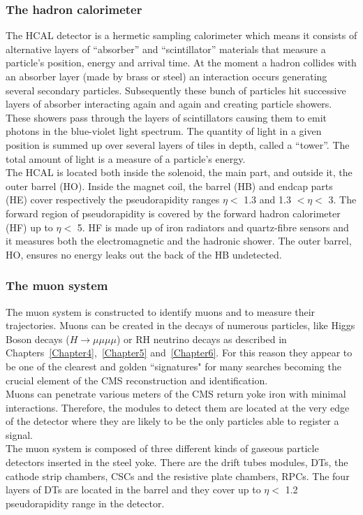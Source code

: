 \subsubsection{The hadron calorimeter}
The HCAL detector is a hermetic sampling calorimeter which means it
consists of alternative layers of ``absorber'' and ``scintillator''
materials that measure a particle’s position, energy and arrival time.
At the moment a hadron collides with an absorber layer (made by brass or steel) an interaction occurs generating several secondary
particles. Subsequently these bunch of particles hit successive layers
of absorber interacting again and again and creating particle showers.
These showers pass through the layers of scintillators
causing them to emit photons in the blue-violet light spectrum.
The quantity of light in a given position is summed up over several
layers of tiles in depth, called a “tower”. The total amount of
light is a measure of a particle’s energy.\\
The HCAL is located both inside the solenoid, the main part, and
outside it, the outer barrel (HO). 
Inside the magnet coil, the barrel (HB) and endcap parts (HE) cover
respectively the pseudorapidity
ranges $\eta<$ 1.3 and 1.3 $<\eta<$ 3.
The forward region of pseudorapidity is covered by the forward hadron
calorimeter (HF) up to $\eta<$ 5. HF is made up of iron radiators and
quartz-fibre sensors and it measures both the electromagnetic and the hadronic shower. 
The outer barrel, HO, ensures no energy leaks out the
back of the HB undetected.

\subsubsection{The muon system}\label{sec:muonsystem}
The muon system is constructed to identify muons and to measure their
trajectories. Muons can be created in the decays of numerous particles,
like Higgs Boson decays ($H \rightarrow \mu \mu \mu \mu$) or 
RH neutrino decays as described in
Chapters~\ref{Chapter4},~\ref{Chapter5} and~\ref{Chapter6}. For this
reason they
appear to be one of the clearest and golden ``signatures" for many
searches becoming the crucial element of the CMS reconstruction
and identification.\\
Muons can penetrate various meters of the CMS return yoke iron with
minimal interactions. Therefore, the modules to detect them are located at
the very edge of the detector where they are likely to be the only particles
able to register a signal.\\
The muon system is composed of three different kinds of gaseous particle
detectors inserted in the steel yoke. 
There are the drift tubes
modules, DTs, the cathode strip chambers, CSCs and the resistive plate
chambers, RPCs.
The four layers of DTs are located in the barrel and they cover up to
$\eta<$ 1.2 pseudorapidity range in the detector. 

